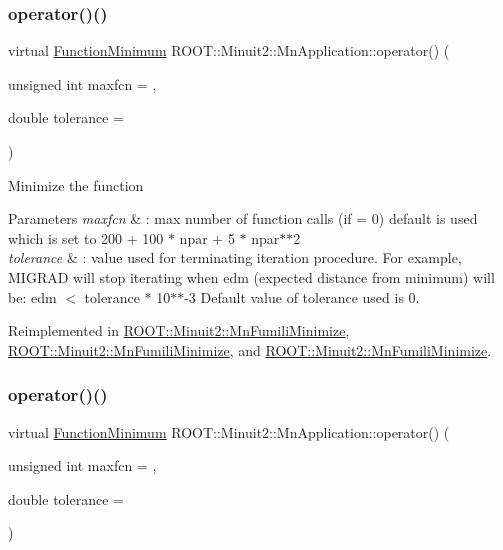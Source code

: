 \subsubsection{\texorpdfstring{operator()()}{operator()()}\hspace{0.1cm}{\footnotesize\ttfamily [2/3]}}
{\footnotesize\ttfamily virtual \mbox{\hyperlink{classROOT_1_1Minuit2_1_1FunctionMinimum}{Function\+Minimum}} R\+O\+O\+T\+::\+Minuit2\+::\+Mn\+Application\+::operator() (\begin{DoxyParamCaption}\item[{unsigned int}]{maxfcn = {},  }\item[{double}]{tolerance = {} }\end{DoxyParamCaption})\hspace{0.3cm}{\ttfamily [virtual]}}

Minimize the function 
\begin{DoxyParams}{Parameters}
{\em maxfcn} & \+: max number of function calls (if = 0) default is used which is set to 200 + 100 $\ast$ npar + 5 $\ast$ npar$\ast$$\ast$2 \\
\hline
{\em tolerance} & \+: value used for terminating iteration procedure. For example, M\+I\+G\+R\+AD will stop iterating when edm (expected distance from minimum) will be\+: edm $<$ tolerance $\ast$ 10$\ast$$\ast$-\/3 Default value of tolerance used is 0. \\
\hline
\end{DoxyParams}


Reimplemented in \mbox{\hyperlink{classROOT_1_1Minuit2_1_1MnFumiliMinimize_a408e4cc7d16335d7a9bfbb8765acec6d}{R\+O\+O\+T\+::\+Minuit2\+::\+Mn\+Fumili\+Minimize}}, \mbox{\hyperlink{classROOT_1_1Minuit2_1_1MnFumiliMinimize_a58da42cb9def0b42c424a3121987e77b}{R\+O\+O\+T\+::\+Minuit2\+::\+Mn\+Fumili\+Minimize}}, and \mbox{\hyperlink{classROOT_1_1Minuit2_1_1MnFumiliMinimize_a58da42cb9def0b42c424a3121987e77b}{R\+O\+O\+T\+::\+Minuit2\+::\+Mn\+Fumili\+Minimize}}.

\mbox{\label{classROOT_1_1Minuit2_1_1MnApplication_a67d746cf939174c8da6552636a11154a}} 
\subsubsection{\texorpdfstring{operator()()}{operator()()}\hspace{0.1cm}{\footnotesize\ttfamily [3/3]}}
{\footnotesize\ttfamily virtual \mbox{\hyperlink{classROOT_1_1Minuit2_1_1FunctionMinimum}{Function\+Minimum}} R\+O\+O\+T\+::\+Minuit2\+::\+Mn\+Application\+::operator() (\begin{DoxyParamCaption}\item[{unsigned int}]{maxfcn = {},  }\item[{double}]{tolerance = {} }\end{DoxyParamCaption})\hspace{0.3cm}{\ttfamily [virtual]}}

